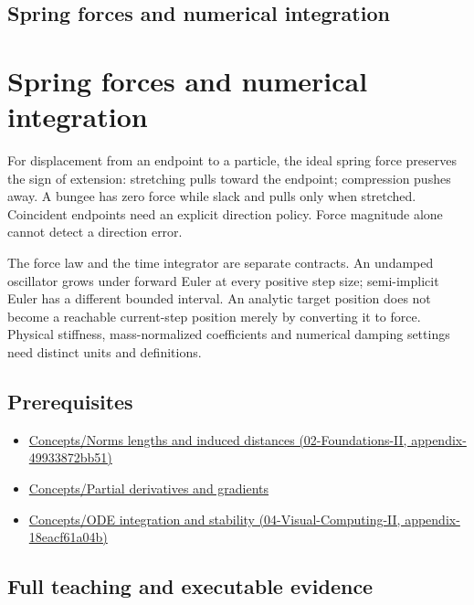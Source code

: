 \hypertarget{appendix-e040e2108923}{}
\section*{Spring forces and numerical integration}
\chapter{Spring forces and numerical integration}\label{appendix-e040e2108923-spring-forces-and-numerical-integration}

For displacement from an endpoint to a particle, the ideal spring force preserves the sign of extension: stretching pulls toward the endpoint; compression pushes away. A bungee has zero force while slack and pulls only when stretched. Coincident endpoints need an explicit direction policy. Force magnitude alone cannot detect a direction error.

The force law and the time integrator are separate contracts. An undamped oscillator grows under forward Euler at every positive step size; semi-implicit Euler has a different bounded interval. An analytic target position does not become a reachable current-step position merely by converting it to force. Physical stiffness, mass-normalized coefficients and numerical damping settings need distinct units and definitions.

\section{Prerequisites}\label{appendix-e040e2108923-prerequisites}

\begin{itemize}
\tightlist
\item
  \href{../02-Foundations-II/main.pdf\#nameddest=appendix-49933872bb51}{Concepts/Norms lengths and induced distances (02-Foundations-II, appendix-49933872bb51)}
\item
  \hyperref[appendix-677b59746ae0]{Concepts/Partial derivatives and gradients}
\item
  \href{../04-Visual-Computing-II/main.pdf\#nameddest=appendix-18eacf61a04b}{Concepts/ODE integration and stability (04-Visual-Computing-II, appendix-18eacf61a04b)}
\end{itemize}

\section{Full teaching and executable evidence}\label{appendix-e040e2108923-full-teaching-and-executable-evidence}


